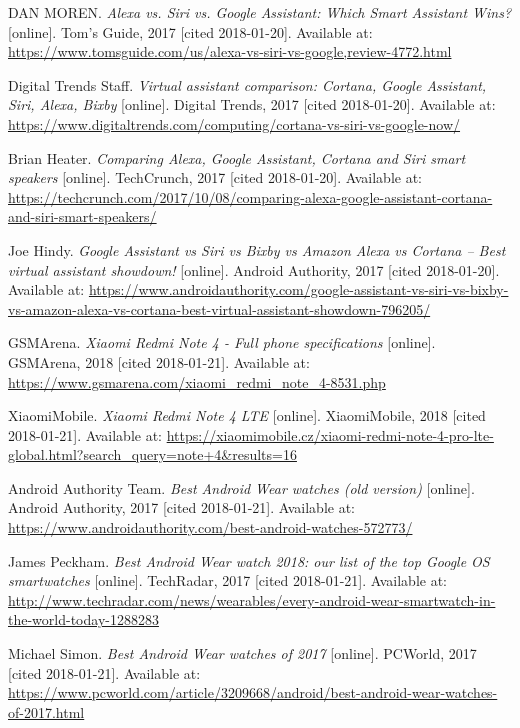 \begin{thebibliography}{10}
DAN MOREN. \textit{Alexa vs. Siri vs. Google Assistant: Which Smart Assistant Wins?} [online]. Tom's Guide, 2017 [cited 2018-01-20]. Available at: \url{https://www.tomsguide.com/us/alexa-vs-siri-vs-google,review-4772.html}

Digital Trends Staff. \textit{Virtual assistant comparison: Cortana, Google Assistant, Siri, Alexa, Bixby} [online]. Digital Trends, 2017 [cited 2018-01-20]. Available at: \url{https://www.digitaltrends.com/computing/cortana-vs-siri-vs-google-now/}

Brian Heater. \textit{Comparing Alexa, Google Assistant, Cortana and Siri smart speakers} [online]. TechCrunch, 2017 [cited 2018-01-20]. Available at: \url{https://techcrunch.com/2017/10/08/comparing-alexa-google-assistant-cortana-and-siri-smart-speakers/}

Joe Hindy. \textit{Google Assistant vs Siri vs Bixby vs Amazon Alexa vs Cortana – Best virtual assistant showdown!} [online]. Android Authority, 2017 [cited 2018-01-20]. Available at: \url{https://www.androidauthority.com/google-assistant-vs-siri-vs-bixby-vs-amazon-alexa-vs-cortana-best-virtual-assistant-showdown-796205/}

GSMArena. \textit{Xiaomi Redmi Note 4 - Full phone specifications} [online]. GSMArena, 2018 [cited 2018-01-21]. Available at: \url{https://www.gsmarena.com/xiaomi_redmi_note_4-8531.php}

XiaomiMobile. \textit{Xiaomi Redmi Note 4 LTE} [online]. XiaomiMobile, 2018 [cited 2018-01-21]. Available at: \url{https://xiaomimobile.cz/xiaomi-redmi-note-4-pro-lte-global.html?search_query=note+4&results=16}

Android Authority Team. \textit{Best Android Wear watches (old version)} [online]. Android Authority, 2017 [cited 2018-01-21]. Available at: \url{https://www.androidauthority.com/best-android-watches-572773/}

James Peckham. \textit{Best Android Wear watch 2018: our list of the top Google OS smartwatches} [online]. TechRadar, 2017 [cited 2018-01-21]. Available at: \url{http://www.techradar.com/news/wearables/every-android-wear-smartwatch-in-the-world-today-1288283}

Michael Simon. \textit{Best Android Wear watches of 2017} [online]. PCWorld, 2017 [cited 2018-01-21]. Available at: \url{https://www.pcworld.com/article/3209668/android/best-android-wear-watches-of-2017.html}


\end{thebibliography}
